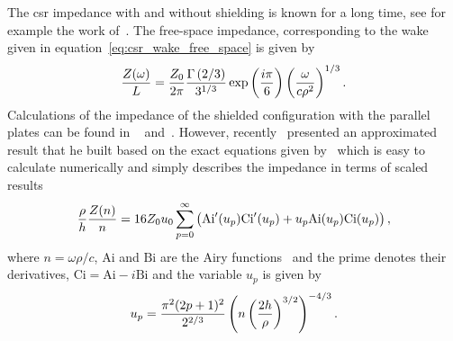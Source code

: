     The \gls{csr} impedance with and without shielding is known for a long time, see for example the work of~. The free-space impedance, corresponding to the wake given in equation~\eqref{eq:csr_wake_free_space} is given by~\cite[Eq. 18]{Nagaoka2014}
    \begin{align}\label{eq:csr_imp_free_space}
        \frac{Z(\omega)}{L} = \frac{Z_0}{2\pi}
                            \frac{\Gamma\left(2/3\right)}{3^{1/3}}
                            \exp\left(\frac{i\pi}{6}\right)
                            \left(\frac{\omega}{c\rho^2}\right)^{1/3}.
    \end{align}
    Calculations of the impedance of the shielded configuration with the parallel plates can be found in ~ and~. However, recently~ presented an approximated result that he built based on the exact equations given by~\citeauthor{Warnock1990} which is easy to calculate numerically and simply describes the impedance in terms of scaled results
    \def \Ai {\text{Ai}}
    \def \Bi {\text{Bi}}
    \def \Ci {\text{Ci}}
    \begin{align}\label{eq:csr_imp_shielding}
        \frac{\rho}{h} \frac{Z(n)}{n} = 16 Z_0 u_0
                        \sum_{p=0}^\infty \fof{\Ai'(u_p)\Ci'(u_p) +
                                            u_p\Ai(u_p)\Ci(u_p)},
    \end{align}
    where $n=\omega\rho/c$, $\Ai$ and $\Bi$ are the Airy functions~\cite{wiki2017c} and the prime denotes their derivatives, $\Ci = \Ai - i\Bi$ and the variable $u_p$ is given by
    \begin{align}
        u_p = \frac{\pi^2(2p+1)^2}{2^{2/3}}\left(n\left(\frac{2h}{\rho}\right)^{3/2}\right)^{-4/3}.
    \end{align}

